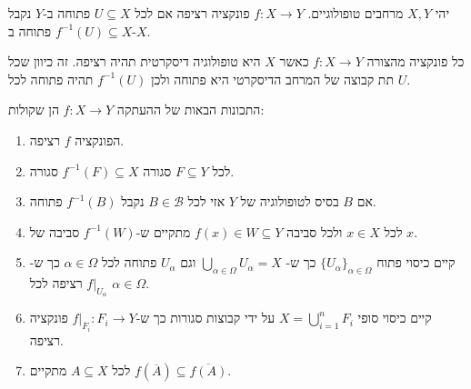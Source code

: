 \documentclass{tstextbook}
\begin{document}
\begin{definition}
יהי \(X,Y\) מרחבים טופולוגיים. \(f:X\to Y\) פונקציה רציפה אם לכל \(U \subseteq X\) פתוחה ב-\(Y\) נקבל \(f^{-1}(U)\subseteq X\) פתוחה ב-\(X\).

\end{definition}
\begin{example}
כל פונקציה מהצורה \(f:X\to Y\) כאשר \(X\) היא טופולוגיה דיסקרטית תהיה רציפה. זה כיוון שכל תת קבוצה של המרחב הדיסקרטי היא פתוחה ולכן \(f^{-1}(U)\) תהיה פתוחה לכל \(U\).

\end{example}
\begin{proposition}
התכונות הבאות של ההעתקה \(f:X\to Y\) הן שקולות:

  \begin{enumerate}
    \item הפונקציה \(f\) רציפה. 


    \item לכל \(F\subseteq Y\) סגורה \(f^{-1}(F)\subseteq X\) סגורה. 


    \item אם \(B\) בסיס לטופולוגיה של \(Y\) אזי לכל \(B \in \mathcal{B}\) נקבל \(f^{-1}(B)\) פתוחה. 


    \item לכל \(x \in X\) ולכל סביבה \(f(x) \in W\subseteq Y\) מתקיים ש-\(f^{-1}(W)\) סביבה של \(x\). 


    \item קיים כיסוי פתוח \(\{ U_{\alpha} \}_{\alpha \in \Omega}\) כך ש- \(\bigcup_{\alpha \in \Omega}U_{\alpha}=X\) וגם \(U_{\alpha}\) פתוחה לכל \(\alpha \in \Omega\) כך ש-\(f|_{U_{\alpha}}\) רציפה לכל \(\alpha \in \Omega\). 


    \item קיים כיסוי סופי \(X=\bigcup_{i=1}^{n}F_{i}\) על ידי קבוצות סגורות כך ש-\(f|_{F_{i}}:F_{i}\to Y\) פונקציה רציפה. 


    \item לכל \(A\subseteq X\) מתקיים \(f(\overline{A})\subseteq \overline{f(A)}\). 


  \end{enumerate}
\end{proposition}
\end{document}
